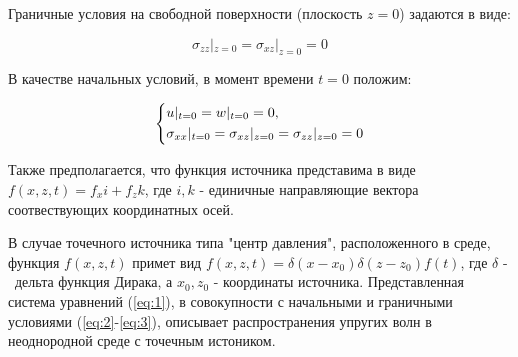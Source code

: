 Граничные условия на свободной поверхности (плоскость $z = 0$) задаются в виде:

\begin{equation}
	\label{eq:2}
	\sigma_{zz}|_{z=0}=\sigma_{xz}|_{z=0}=0
\end{equation}

В качестве начальных условий, в момент времени $t=0$ положим:

\begin{equation}
\begin{dcases}
	\label{eq:3}
	u |_{t=0}= w|_{t=0} = 0, \\
	\sigma_{xx}|_{t=0}=\sigma_{xz}|_{z=0}=\sigma_{zz}|_{z=0}=0
\end{dcases}
\end{equation}

Также предполагается, что функция источника представима в виде $f(x,z,t)=f_xi+f_zk$,
где $i, k$ - единичные направляющие вектора соотвествующих координатных осей.

В случае точечного источника типа "центр давления", расположенного в среде, функция $f(x,z,t)$ примет вид $f(x,z,t)=\delta(x-x_0)\delta(z-z_0)f(t)$,
где $\delta$ -  дельта функция Дирака, а $x_0, z_0$ - координаты источника.
Представленная система уравнений (\ref{eq:1}), в совокупности с начальными и граничными условиями (\ref{eq:2}-\ref{eq:3}),
описывает распространения упругих волн в неоднородной среде с точечным истоником.
